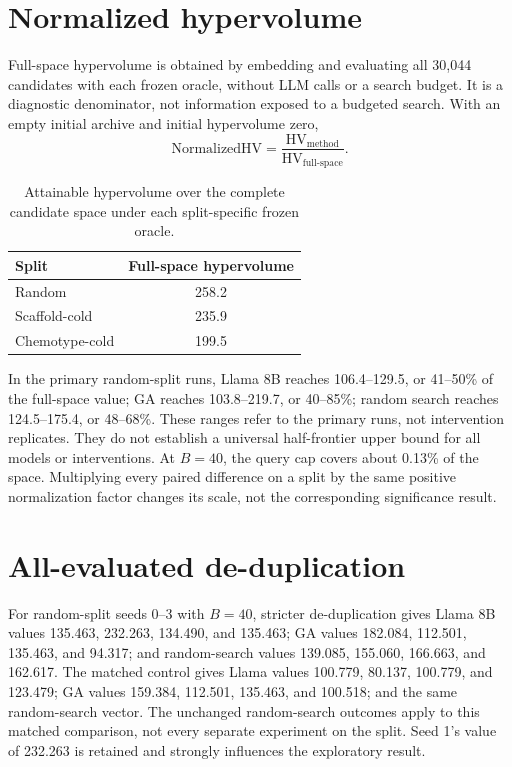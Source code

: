 \section{Normalized hypervolume}
\label{app:normalized-hv}
Full-space hypervolume is obtained by embedding and evaluating all 30,044 candidates with each frozen oracle, without LLM calls or a search budget. It is a diagnostic denominator, not information exposed to a budgeted search. With an empty initial archive and initial hypervolume zero,
\begin{equation}
\mathrm{NormalizedHV}=\frac{\mathrm{HV}_{\mathrm{method}}}{\mathrm{HV}_{\mathrm{full\text{-}space}}}.
\end{equation}
\begin{table}[htbp]
\caption{Attainable hypervolume over the complete candidate space under each split-specific frozen oracle.}
\label{tab:full-space-hv}
\centering
\begin{tabular}{@{}lc@{}}
\toprule
Split & Full-space hypervolume \\
\midrule
Random & 258.2 \\
Scaffold-cold & 235.9 \\
Chemotype-cold & 199.5 \\
\bottomrule
\end{tabular}
\end{table}

In the primary random-split runs, Llama 8B reaches 106.4--129.5, or 41--50\% of the full-space value; GA reaches 103.8--219.7, or 40--85\%; random search reaches 124.5--175.4, or 48--68\%. These ranges refer to the primary runs, not intervention replicates. They do not establish a universal half-frontier upper bound for all models or interventions. At $B=40$, the query cap covers about 0.13\% of the space. Multiplying every paired difference on a split by the same positive normalization factor changes its scale, not the corresponding significance result.

\section{All-evaluated de-duplication}
\label{app:dedup-all-evaluated}
For random-split seeds 0--3 with $B=40$, stricter de-duplication gives Llama 8B values 135.463, 232.263, 134.490, and 135.463; GA values 182.084, 112.501, 135.463, and 94.317; and random-search values 139.085, 155.060, 166.663, and 162.617. The matched control gives Llama values 100.779, 80.137, 100.779, and 123.479; GA values 159.384, 112.501, 135.463, and 100.518; and the same random-search vector. The unchanged random-search outcomes apply to this matched comparison, not every separate experiment on the split. Seed 1's value of 232.263 is retained and strongly influences the exploratory result.

